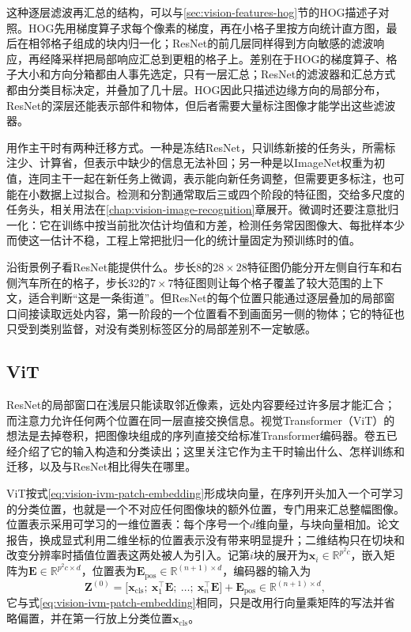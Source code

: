这种逐层滤波再汇总的结构，可以与\ref{sec:vision-features-hog}节的HOG描述子对照。HOG先用梯度算子求每个像素的梯度，再在小格子里按方向统计直方图，最后在相邻格子组成的块内归一化；ResNet的前几层同样得到方向敏感的滤波响应，再经降采样把局部响应汇总到更粗的格子上。差别在于HOG的梯度算子、格子大小和方向分箱都由人事先选定，只有一层汇总；ResNet的滤波器和汇总方式都由分类目标决定，并叠加了几十层。HOG因此只描述边缘方向的局部分布，ResNet的深层还能表示部件和物体，但后者需要大量标注图像才能学出这些滤波器。

用作主干时有两种迁移方式。一种是冻结ResNet，只训练新接的任务头，所需标注少、计算省，但表示中缺少的信息无法补回；另一种是以ImageNet权重为初值，连同主干一起在新任务上微调，表示能向新任务调整，但需要更多标注，也可能在小数据上过拟合。检测和分割通常取后三或四个阶段的特征图，交给多尺度的任务头，相关用法在\ref{chap:vision-image-recognition}章展开。微调时还要注意批归一化：它在训练中按当前批次估计均值和方差，检测任务常因图像大、每批样本少而使这一估计不稳，工程上常把批归一化的统计量固定为预训练时的值。

沿街景例子看ResNet能提供什么。步长8的$28\times28$特征图仍能分开左侧自行车和右侧汽车所在的格子，步长32的$7\times7$特征图则让每个格子覆盖了较大范围的上下文，适合判断“这是一条街道”。但ResNet的每个位置只能通过逐层叠加的局部窗口间接读取远处内容，第一阶段的一个位置看不到画面另一侧的物体；它的特征也只受到类别监督，对没有类别标签区分的局部差别不一定敏感。

\subsection{ViT}
\label{sec:vision-ivm-vit}

ResNet的局部窗口在浅层只能读取邻近像素，远处内容要经过许多层才能汇合；而注意力允许任何两个位置在同一层直接交换信息。视觉Transformer（ViT）的想法是去掉卷积，把图像块组成的序列直接交给标准Transformer编码器。卷五已经介绍了它的输入构造和分类读出；这里关注它作为主干时输出什么、怎样训练和迁移，以及与ResNet相比得失在哪里。

ViT按式\eqref{eq:vision-ivm-patch-embedding}形成块向量，在序列开头加入一个可学习的分类位置，也就是一个不对应任何图像块的额外位置，专门用来汇总整幅图像。位置表示采用可学习的一维位置表：每个序号一个$d$维向量，与块向量相加。论文报告，换成显式利用二维坐标的位置表示没有带来明显提升；二维结构只在切块和改变分辨率时插值位置表这两处被人为引入。记第$i$块的展开为$\bm x_i\in\mathbb R^{p^2c}$，嵌入矩阵为$\bm E\in\mathbb R^{p^2c\times d}$，位置表为$\bm E_{\mathrm{pos}}\in\mathbb R^{(n+1)\times d}$，编码器的输入为
\begin{equation}
  \bm Z^{(0)}=\bigl[\bm x_{\mathrm{cls}};\ \bm x_1^\top\bm E;\ \ldots;\ \bm x_n^\top\bm E\bigr]+\bm E_{\mathrm{pos}}\in\mathbb R^{(n+1)\times d},
  \label{eq:vision-ivm-vit-input}
\end{equation}
它与式\eqref{eq:vision-ivm-patch-embedding}相同，只是改用行向量乘矩阵的写法并省略偏置，并在第一行放上分类位置$\bm x_{\mathrm{cls}}$。

